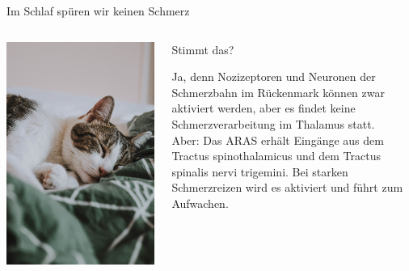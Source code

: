 \documentclass{beamer}
\begin{document}
\begin{frame}{Im Schlaf spüren wir keinen Schmerz}

\begin{columns}[c]

\begin{column}{5cm}
\begin{center}
    \includegraphics[width=\textwidth]{mathias-reding-4_YakZekVv0-unsplash.jpg}
\end{center}
\end{column}

\begin{column}{5cm}

Stimmt das? \\[0.5cm]
\pause

Ja, denn Nozizeptoren und Neuronen der Schmerzbahn im Rückenmark können zwar aktiviert werden, aber es findet keine Schmerzverarbeitung im Thalamus statt.  \\[0.5cm]

\pause
Aber: Das ARAS erhält Eingänge aus dem Tractus spinothalamicus und dem Tractus spinalis nervi trigemini. Bei starken Schmerzreizen wird es aktiviert und führt zum Aufwachen. 

\end{column}


\end{columns}

    
\end{frame}
\end{document}
